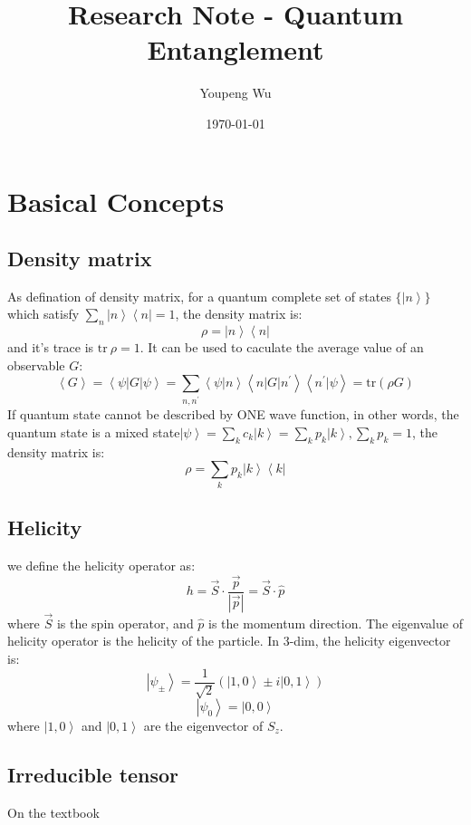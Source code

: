 \documentclass{article}
\newcommand{\ket}[1]{\left|#1\right\rangle}
\newcommand{\bra}[1]{\left\langle#1\right|}
\newcommand{\braket}[1]{\left\langle#1\right\rangle}
\begin{document}
\title{Research Note - Quantum Entanglement}
\author{Youpeng Wu}
\date{\today}
\maketitle

\section{Basical Concepts }
\subsection{Density matrix}
As defination of density matrix, for a quantum complete set of states \(\{\ket{n}\}\) which satisfy \(\sum_n \ket{n}\bra{n}=1\), the density matrix is:
\[\rho=\ket{n}\bra{n}\]
and it's trace is \(\mathrm{tr}\ \rho=1\). It can be used to caculate the average value of an observable \(G\): 
\[\braket{G}=\braket{\psi|G|\psi}=\sum_{n,n^\prime}\braket{\psi|n}\braket{n|G|n^\prime}\braket{n^\prime|\psi}=\mathrm{tr}(\rho G)\]
If quantum state cannot be described by ONE wave function, in other words, the quantum state is a mixed state\(\ket{\psi}=\sum_k c_k\ket{k}=\sum_kp_k\ket{k},\sum_k p_k=1\), the density matrix is:
\[\rho=\sum_k p_k\ket{k}\bra{k}\]

\subsection{Helicity}
we define the helicity operator as:
\[h=\vec{S}\cdot\frac{\vec{p}}{|\vec{p}|}=\vec{S}\cdot\hat{p}\]
where \(\vec{S}\) is the spin operator, and \(\hat{p}\) is the momentum direction. The eigenvalue of helicity operator is the helicity of the particle. 
In 3-dim, the helicity eigenvector is:
\[\ket{\psi_{\pm}}=\frac{1}{\sqrt{2}}\left(\ket{1,0}\pm i\ket{0,1}\right)\]
\[\ket{\psi_{0}}=\ket{0,0}\]
where \(\ket{1,0}\) and \(\ket{0,1}\) are the eigenvector of \(S_z\).

\subsection{Irreducible tensor}
On the textbook 
\end{document}

